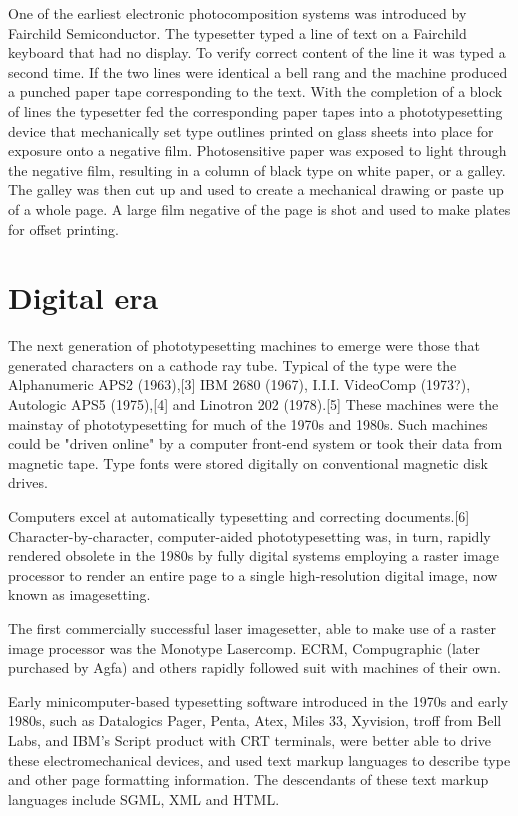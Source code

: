 \documentclass{article}
\begin{document}
One of the earliest electronic photocomposition systems was introduced by Fairchild Semiconductor. The typesetter typed a line of text on a Fairchild keyboard that had no display. To verify correct content of the line it was typed a second time. If the two lines were identical a bell rang and the machine produced a punched paper tape corresponding to the text. With the completion of a block of lines the typesetter fed the corresponding paper tapes into a phototypesetting device that mechanically set type outlines printed on glass sheets into place for exposure onto a negative film. Photosensitive paper was exposed to light through the negative film, resulting in a column of black type on white paper, or a galley. The galley was then cut up and used to create a mechanical drawing or paste up of a whole page. A large film negative of the page is shot and used to make plates for offset printing.

\section{Digital era}

The next generation of phototypesetting machines to emerge were those that generated characters on a cathode ray tube. Typical of the type were the Alphanumeric APS2 (1963),[3] IBM 2680 (1967), I.I.I. VideoComp (1973?), Autologic APS5 (1975),[4] and Linotron 202 (1978).[5] These machines were the mainstay of phototypesetting for much of the 1970s and 1980s. Such machines could be "driven online" by a computer front-end system or took their data from magnetic tape. Type fonts were stored digitally on conventional magnetic disk drives.

Computers excel at automatically typesetting and correcting documents.[6] Character-by-character, computer-aided phototypesetting was, in turn, rapidly rendered obsolete in the 1980s by fully digital systems employing a raster image processor to render an entire page to a single high-resolution digital image, now known as imagesetting.

The first commercially successful laser imagesetter, able to make use of a raster image processor was the Monotype Lasercomp. ECRM, Compugraphic (later purchased by Agfa) and others rapidly followed suit with machines of their own.

Early minicomputer-based typesetting software introduced in the 1970s and early 1980s, such as Datalogics Pager, Penta, Atex, Miles 33, Xyvision, troff from Bell Labs, and IBM's Script product with CRT terminals, were better able to drive these electromechanical devices, and used text markup languages to describe type and other page formatting information. The descendants of these text markup languages include SGML, XML and HTML.
\end{document}

